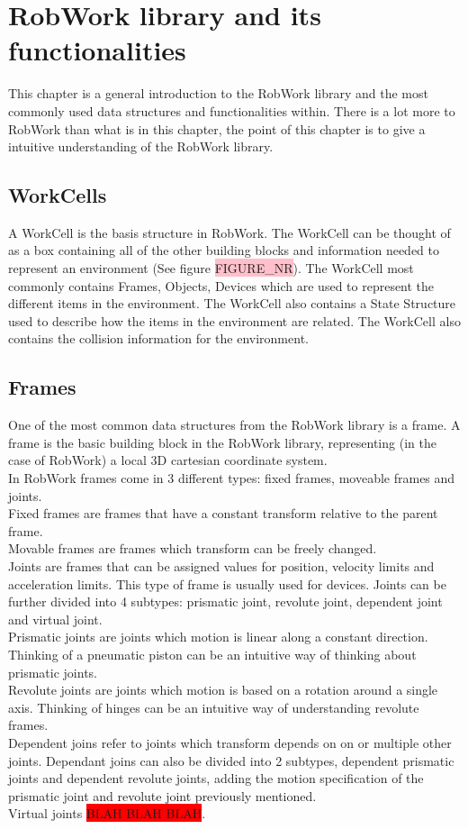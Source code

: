 \section{RobWork library and its functionalities}
This chapter is a general introduction to the RobWork library and the most commonly used data structures and functionalities within. There is a lot more to RobWork than what is in this chapter, the point of this chapter is to give a intuitive understanding of the RobWork library.


\subsection{WorkCells}
A WorkCell is the basis structure in RobWork. The WorkCell can be thought of as a box containing all of the other building blocks and information needed to represent an environment (See figure \colorbox{pink}{FIGURE_NR}). The WorkCell most commonly contains Frames, Objects, Devices which are used to represent the different items in the environment. The WorkCell also contains a State Structure used to describe how the items in the environment are related. The WorkCell also contains the collision information for the environment.


\subsection{Frames}
One of the most common data structures from the RobWork library is a frame. A frame is the basic building block in the RobWork library, representing (in the case of RobWork) a local 3D cartesian coordinate system.\\

In RobWork frames come in 3 different types: fixed frames, moveable frames and joints.\\
Fixed frames are frames that have a constant transform relative to the parent frame.\\
Movable frames are frames which transform can be freely changed.\\
Joints are frames that can be assigned values for position, velocity limits and acceleration limits. This type of frame is usually used for devices. Joints can be further divided into 4 subtypes: prismatic joint, revolute joint, dependent joint and virtual joint.\\
Prismatic joints are joints which motion is linear along a constant direction. Thinking of a pneumatic piston can be an intuitive way of thinking about prismatic joints.\\
Revolute joints are joints which motion is based on a rotation around a single axis. Thinking of hinges can be an intuitive way of understanding revolute frames.\\
Dependent joins refer to joints which transform depends on on or multiple other joints. Dependant joins can also be divided into 2 subtypes, dependent prismatic joints and dependent revolute joints, adding the motion specification of the prismatic joint and revolute joint previously mentioned.\\
Virtual joints \colorbox{red}{BLAH BLAH BLAH}.\\

